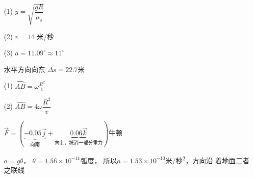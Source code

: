\answer (1) $ y = \sqrt { \dfrac { g R } { \mu _ { s } } } $

(2) $ v = 14 $ 米/秒

(3) $ a = 1 1 . 0 9 ^ { \circ } \approx 1 1 ^ { \circ } $

\answer 水平方向向东 $ \Delta s = 2 2 . 7  $米

\answer (1) $\wideparen{A B} = \omega \frac { R ^ { 2 } } { v }$

(2) $ \wideparen{A B} = 4 \omega \dfrac { R ^ { 2 } } { v } $

\answer $ \vec{F} = ( \underbrace{- 0 . 0 5 \vec{j}}_{\text{向南}} + \underbrace{0 . 0 6 \vec{k}} _{\text{向上，抵消一部分重力}} ) $牛顿

\answer $ a = g \theta  $， $ \theta = 1 . 5 6 \times 1 0 ^ { - 1 1 } $弧度， 所以$ a = 1 . 5 3 \times 1 0 ^ { - 1 0 } $米/秒\textsuperscript{2}，方向沿
着地面二者之联线
